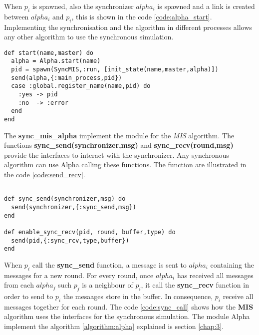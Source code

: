 When $p_i$ is spawned, also the synchronizer $alpha_i$ is spawned and a link is created between $alpha_i$ and $p_i$, this is shown in the code \ref{code:alpha_start}.  Implementing the synchronisation and the algorithm in different processes allows any other algorithm to use the synchronous simulation. 

\begin{lstlisting}[frame=single, columns=fullflexible, mathescape=true, caption= start function , label = code:alpha_start]
def start(name,master) do
  alpha = Alpha.start(name)
  pid = spawn(SyncMIS,:run, [init_state(name,master,alpha)])
  send(alpha,{:main_process,pid})
  case :global.register_name(name,pid) do
    :yes -> pid
    :no  -> :error
  end
end

\end{lstlisting}



The \textbf{sync\_mis\_alpha} implement the module for the \textit{MIS} algorithm. The functions \textbf{sync\_send(synchronizer,msg)} and \textbf{sync\_recv(round,msg)} provide the interfaces to interact with the synchronizer. Any synchronous algorithm can use Alpha calling these functions. The function are illustrated in the code \ref{code:send_recv}.

\begin{lstlisting}[frame=single, columns=fullflexible, mathescape=true, caption= Interface for synchronise send and receive, label = code:send_recv]

def sync_send(synchronizer,msg) do
  send(synchronizer,{:sync_send,msg})
end

def enable_sync_recv(pid, round, buffer,type) do
  send(pid,{:sync_rcv,type,buffer})
end

\end{lstlisting}


When $p_i$ call the \textbf{sync\_send} function, a message is sent to $alpha_i$ containing the messages for a new round. For every round, once $alpha_i$ has received all messages from each $alpha_j$ such $p_j$ is a neighbour of $p_i$, it call the \textbf{sync\_recv} function in order to send to $p_i$ the mesaages store in the buffer. In consequence, $p_i$ receive all messages together for each round.  The code \ref{code:sync_call} shows how the \textbf{MIS} algorithm uses the interfaces for the synchronous simulation. The module Alpha implement the algorithm \ref{algorithm:alpha} explained is section \ref{chap:3}.

